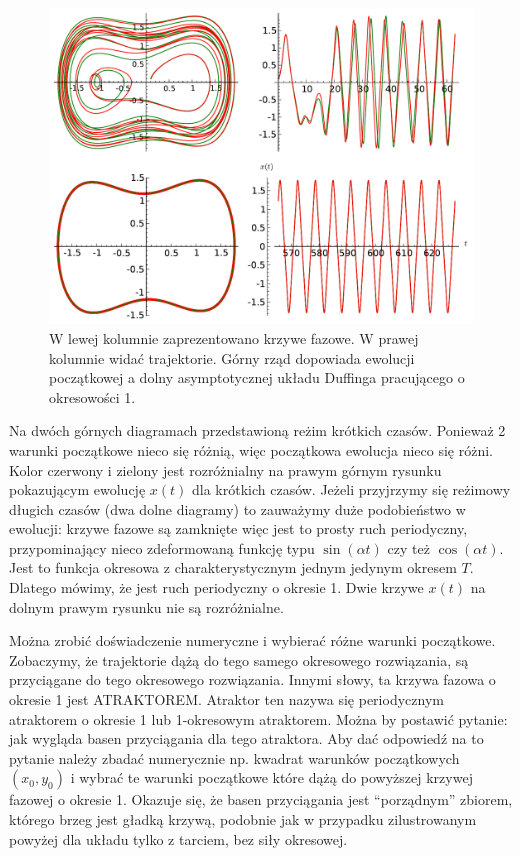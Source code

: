 \documentclass[a4paper,12pt,polish]{sphinxmanual}
\begin{document}
\begin{figure}[htbp]
\centering
\capstart

\includegraphics{sage_chII011_07.pdf}
\caption{W lewej kolumnie zaprezentowano krzywe fazowe.
W prawej kolumnie widać trajektorie.
Górny rząd dopowiada ewolucji początkowej a dolny
asymptotycznej układu Duffinga pracującego
o okresowości 1.}\end{figure}

Na dwóch górnych diagramach przedstawioną reżim krótkich czasów. Ponieważ 2 warunki początkowe nieco się różnią, więc początkowa ewolucja nieco się różni. Kolor czerwony i zielony jest rozróżnialny na prawym górnym rysunku pokazującym ewolucję $x(t)$ dla krótkich czasów.  Jeżeli przyjrzymy się reżimowy długich czasów (dwa dolne diagramy) to zauważymy duże podobieństwo w ewolucji: krzywe fazowe są zamknięte więc jest to prosty ruch periodyczny, przypominający nieco zdeformowaną funkcję typu $\sin(\alpha t)$ czy też $\cos(\alpha t)$. Jest to funkcja okresowa z charakterystycznym jednym jedynym  okresem $T$. Dlatego mówimy, że jest ruch periodyczny o okresie 1. Dwie krzywe $x(t)$ na dolnym prawym rysunku nie są rozróżnialne.

Można zrobić doświadczenie numeryczne i wybierać różne warunki początkowe. Zobaczymy, że trajektorie dążą do tego samego okresowego rozwiązania, są przyciągane do tego okresowego rozwiązania. Innymi słowy, ta krzywa fazowa o okresie 1  jest ATRAKTOREM.  Atraktor ten nazywa się periodycznym atraktorem o okresie 1 lub 1-okresowym  atraktorem. Można by postawić pytanie: jak wygląda basen przyciągania dla tego atraktora. Aby dać odpowiedź na to pytanie należy zbadać numerycznie np. kwadrat warunków początkowych  $(x_0, y_0)$ i wybrać te warunki początkowe które dążą do powyższej krzywej fazowej o okresie 1. Okazuje się, że basen przyciągania jest ``porządnym'' zbiorem, którego brzeg jest gładką krzywą, podobnie jak w przypadku zilustrowanym powyżej dla układu tylko z tarciem, bez siły okresowej.
\end{document}
